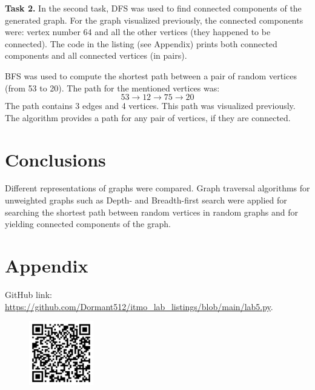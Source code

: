 \documentclass[12pt, a4paper]{article}
\begin{document}
\newpage

\textbf{Task 2.} In the second task, DFS was used to find connected components of the generated graph. For the graph visualized previously, the connected components were: vertex number 64 and all the other vertices (they happened to be connected). The code in the listing (see Appendix) prints both connected components and all connected vertices (in pairs).

BFS was used to compute the shortest path between a pair of random vertices (from 53 to 20). The path for the mentioned vertices was:
\[ 53 \to 12 \to 75 \to 20 \]
The path contains 3 edges and 4 vertices. This path was visualized previously. The algorithm provides a path for any pair of vertices, if they are connected.

\section*{Conclusions}

Different representations of graphs were compared. Graph traversal algorithms for unweighted graphs such as Depth- and Breadth-first search were applied for searching the shortest path between random vertices in random graphs and for yielding connected components of the graph.

\section*{Appendix}

GitHub link: \url{https://github.com/Dormant512/itmo_lab_listings/blob/main/lab5.py}.

\begin{figure}[!h]
\centering
\includegraphics[width=0.25\textwidth]{lab5.png}
\end{figure}
\end{document}

